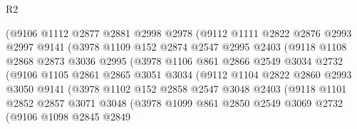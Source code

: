 \begin{lexlean}{R2}
\begin{coremodule}
                    (@9106
                      @1112
                      @2877
                      @2881
                      @2998
                      @2978
                      (@9112
                        @1111
                        @2822
                        @2876
                        @2993
                        @2997
                        @9141
                        (@3978
                          @1109
                          @152
                          @2874
                          @2547
                          @2995
                          @2403
                          (@9118
                            @1108
                            @2868
                            @2873
                            @3036
                            @2995
                            (@3978
                              @1106
                              @861
                              @2866
                              @2549
                              @3034
                              @2732
                              (@9106
                                @1105
                                @2861
                                @2865
                                @3051
                                @3034
                                (@9112
                                  @1104
                                  @2822
                                  @2860
                                  @2993
                                  @3050
                                  @9141
                                  (@3978
                                    @1102
                                    @152
                                    @2858
                                    @2547
                                    @3048
                                    @2403
                                    (@9118
                                      @1101
                                      @2852
                                      @2857
                                      @3071
                                      @3048
                                      (@3978
                                        @1099
                                        @861
                                        @2850
                                        @2549
                                        @3069
                                        @2732
                                        (@9106
                                          @1098
                                          @2845
                                          @2849

\end{coremodule}
\end{lexlean}
